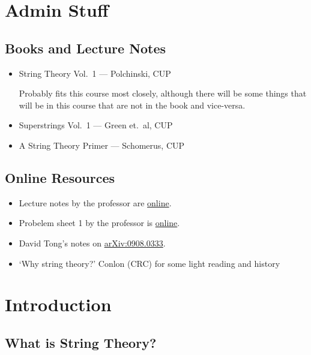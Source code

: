 
\chapter*{Admin Stuff}%

\section*{Books and Lecture Notes}%

\begin{itemize}
  \item String Theory Vol.~1 --- Polchinski, CUP

  Probably fits this course most closely, although there will be some things that will be in this course that are not in the book and vice-versa.

  \item Superstrings Vol.~1 --- Green et.~al, CUP

  \item A String Theory Primer --- Schomerus, CUP
\end{itemize}

\section*{Online Resources}%

\begin{itemize}
  \item Lecture notes by the professor are \href{https://www.damtp.cam.ac.uk/user/rar31/LectureNotes.pdf}{online}.
  \item Probelem sheet 1 by the professor is \href{https://www.damtp.cam.ac.uk/user/rar31/ProblemSet1.pdf}{online}.
  \item David Tong's notes on \href{https://arxiv.org/abs/0908.0333}{arXiv:0908.0333}.
  \item `Why string theory?' Conlon (CRC) for some light reading and history
\end{itemize}

\chapter{Introduction}%
\label{cha:introduction}

\section{What is String Theory?}%
\label{sec:what_is_string_theory_}

